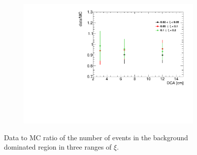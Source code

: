   \begin{figure}[h!]
  	\centering
  	\begin{subfigure}{.49\textwidth}
  		\includegraphics[width=\textwidth,page=1]{chapters/chrgSTAR/img/DCAproton/Ratio.pdf}
  	\end{subfigure}
  	\begin{minipage}{.49\textwidth}
  		\caption[Data to MC ratio of  the  number of events in the background dominated region  in three ranges of $\xi$]{Data to MC ratio of  the  number of events in the background dominated region in three ranges of $\xi$.}
  		\label{fig:protonBkgSystRatio}
  	\end{minipage}
  	
  \end{figure}
 \captionsetup{format=default,indention=0pt,justification=justified}
 
  \FloatBarrier
